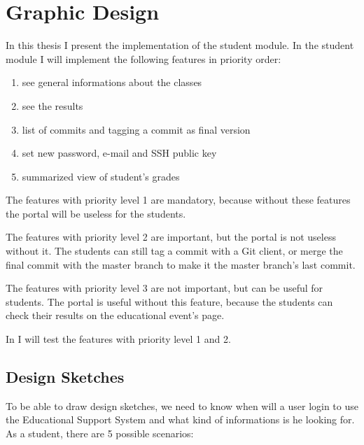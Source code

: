 \chapter{Graphic Design}

In this thesis I present the implementation of the student module. In the student module I will implement the following features in priority order:
\begin{enumerate}
	\item see general informations about the classes
	\setcounter{enumi}{0}
	\item see the results
	\item list of commits and tagging a commit as final version
	\setcounter{enumi}{1}
	\item set new password, e-mail and SSH public key
	\item summarized view of student's grades
\end{enumerate}

The features with priority level 1 are mandatory, because without these features the portal will be useless for the students.

The features with priority level 2 are important, but the portal is not useless without it. The students can still tag a commit with a Git client, or merge the final commit with the master branch to make it the master branch's last commit. 

The features with priority level 3 are not important, but can be useful for students. The portal is useful without this feature, because the students can check their results on the educational event's page.

In  I will test the features with priority level 1 and 2.


\section{Design Sketches}
To be able to draw design sketches, we need to know when will a user login to use the Educational Support System and what kind of informations is he looking for. As a student, there are 5 possible scenarios:

